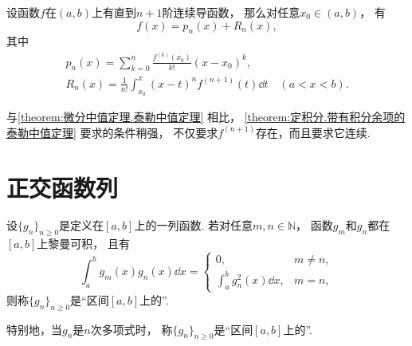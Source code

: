 \begin{theorem}\label{theorem:定积分.带有积分余项的泰勒中值定理}
设函数\(f\)在\((a,b)\)上有直到\(n+1\)阶连续导函数，
那么对任意\(x_0\in(a,b)\)，
有\begin{equation*}
	f(x) = p_n(x) + R_n(x),
\end{equation*}
其中\begin{gather}
	p_n(x) = \sum_{k=0}^n \frac{f^{(k)}(x_0)}{k!} (x-x_0)^k, \\
	R_n(x) = \frac1{n!} \int_{x_0}^x (x-t)^n f^{(n+1)}(t) \dd{t}
	\quad(a<x<b).
\end{gather}
\end{theorem}
\begin{remark}
与\cref{theorem:微分中值定理.泰勒中值定理} 相比，
\cref{theorem:定积分.带有积分余项的泰勒中值定理} 要求的条件稍强，
不仅要求\(f^{(n+1)}\)存在，而且要求它连续.
\end{remark}

\section{正交函数列}
\begin{definition}
设\(\{g_n\}_{n\geq0}\)是定义在\([a,b]\)上的一列函数.
若对任意\(m,n\in\mathbb{N}\)，
函数\(g_m\)和\(g_n\)都在\([a,b]\)上黎曼可积，
且有\[
	\int_a^b g_m(x) g_n(x) \dd{x} = \left\{ \begin{array}{ll}
		0, & m \neq n, \\
		\int_a^b g_n^2(x) \dd{x}, & m = n,
	\end{array} \right.
\]
则称\(\{g_n\}_{n\geq0}\)是“区间\([a,b]\)上的”.

特别地，当\(g_n\)是\(n\)次多项式时，
称\(\{g_n\}_{n\geq0}\)是“区间\([a,b]\)上的”.
\end{definition}

